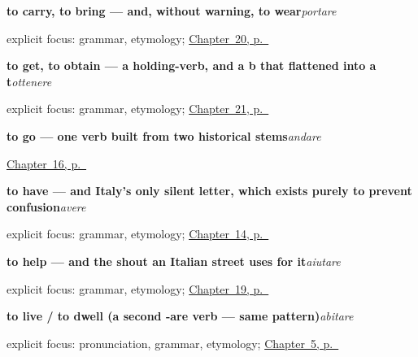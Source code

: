 \noindent\begin{minipage}[t]{\linewidth}
\raggedright
\textbf{to carry, to bring — and, without warning, to wear}\enspace\emph{portare}\par
\footnotesize explicit focus: grammar, etymology; \hyperref[ch:it-carry-buy-wait-meet]{Chapter~20, p.~\pageref*{ch:it-carry-buy-wait-meet}}
\end{minipage}\par\smallskip

\noindent\begin{minipage}[t]{\linewidth}
\raggedright
\textbf{to get, to obtain — a holding-verb, and a b that flattened into a t}\enspace\emph{ottenere}\par
\footnotesize explicit focus: grammar, etymology; \hyperref[ch:it-play-get-answer]{Chapter~21, p.~\pageref*{ch:it-play-get-answer}}
\end{minipage}\par\smallskip

\noindent\begin{minipage}[t]{\linewidth}
\raggedright
\textbf{to go — one verb built from two historical stems}\enspace\emph{andare}\par
\footnotesize \hyperref[ch:it-essere-andare-past]{Chapter~16, p.~\pageref*{ch:it-essere-andare-past}}
\end{minipage}\par\smallskip

\noindent\begin{minipage}[t]{\linewidth}
\raggedright
\textbf{to have — and Italy's only silent letter, which exists purely to prevent confusion}\enspace\emph{avere}\par
\footnotesize explicit focus: grammar, etymology; \hyperref[ch:it-having-and-age]{Chapter~14, p.~\pageref*{ch:it-having-and-age}}
\end{minipage}\par\smallskip

\noindent\begin{minipage}[t]{\linewidth}
\raggedright
\textbf{to help — and the shout an Italian street uses for it}\enspace\emph{aiutare}\par
\footnotesize explicit focus: grammar, etymology; \hyperref[ch:it-backwards-verb]{Chapter~19, p.~\pageref*{ch:it-backwards-verb}}
\end{minipage}\par\smallskip

\noindent\begin{minipage}[t]{\linewidth}
\raggedright
\textbf{to live / to dwell (a second -are verb — same pattern)}\enspace\emph{abitare}\par
\footnotesize explicit focus: pronunciation, grammar, etymology; \hyperref[ch:it-first-verbs]{Chapter~5, p.~\pageref*{ch:it-first-verbs}}
\end{minipage}\par\smallskip


